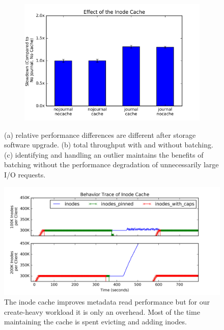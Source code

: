 \begin{figure}[t]
\begin{subfigure}[b]{.3\linewidth}
      \centering
      \includegraphics[width=1.0\linewidth]{graphs/slowdown-cache.png}
      \caption{}
      \label{fig:batching-outlier}
  \end{subfigure}
  \caption{(a) relative performance differences are different after storage
  software upgrade. (b) total throughput with and without batching. (c)
  identifying and handling an outlier maintains the benefits
  of batching without the performance degradation of unnecessarily large I/O
  requests.}
\end{figure}

\begin{figure}[tb] \centering
\includegraphics[width=1\linewidth]{./graphs/behavior-cache.png} 
\caption{The inode cache improves metadata read performance but for our
create-heavy workload it is only an overhead. Most of the time maintaining the
cache is spent evicting and adding inodes.}\label{fig:inode-cache}
\end{figure}

